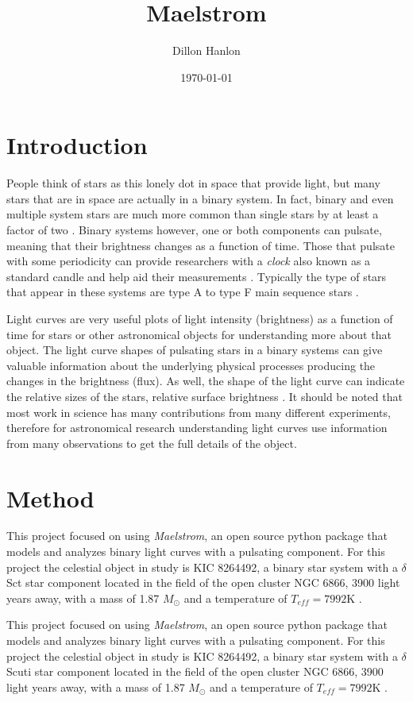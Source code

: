 \documentclass[]{article}
\title{Maelstrom}
\author{Dillon Hanlon}
\date{\today}
\begin{document}
\maketitle
\section{Introduction}
People think of stars as this lonely dot in space that provide light, but
many stars that are in space are actually in a binary system. In fact, binary and even multiple system stars are much more common than single stars by at least a factor of two \cite{guszejnov2017protostellar}. Binary systems however, one or both components can pulsate, meaning that their brightness changes as a function of time. Those that pulsate with some periodicity can provide researchers with a \textit{clock} also known as a standard candle and help aid their measurements  \cite{murphy2018finding}. Typically the type of stars that appear in these systems are type A to type F main sequence stars \cite{garg2010high}.

Light curves are very useful plots of light intensity (brightness) as a function of time for stars or other astronomical objects for understanding more about that object. The light curve shapes of pulsating stars in a binary systems can give valuable information about the underlying physical processes producing the changes in the brightness (flux). As well, the shape of the light curve can indicate the relative sizes of the stars, relative surface brightness \cite{russell1912determination}. It should be noted that most work in science has many contributions from many different experiments, therefore for astronomical research understanding light curves use information from many observations to get the full details of the object.

\section{Method}
This project focused on using \textit{Maelstrom}, an open source python package that models and analyzes binary light curves with a pulsating component. For this project the celestial object in study is KIC 8264492, a binary star system with a $\delta$ Sct star component located in the field of the open cluster NGC 6866, 3900 light years away, with a mass of 1.87 $M_{\odot}$ and a temperature of $T_{eff} = 7992$K \cite{balona2013pulsation,shibahashi2015fm}.

This project focused on using \textit{Maelstrom}, an open source python package that models and analyzes binary light curves with a pulsating component. For this project the celestial object in study is KIC 8264492, a binary star system with a $\delta$ Scuti star component located in the field of the open cluster NGC 6866, 3900 light years away, with a mass of 1.87 $M_{\odot}$ and a temperature of $T_{eff} = 7992$K \cite{balona2013pulsation,shibahashi2015fm}. 
\end{document}

